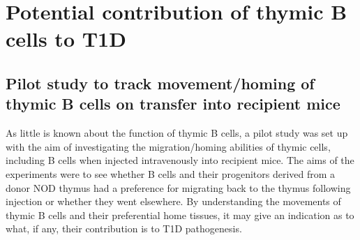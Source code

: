 \section{Potential contribution of thymic B cells to T1D}

\subsection{Pilot study to track movement/homing of thymic B cells on transfer into recipient mice}



As little is known about the function of thymic B cells, a pilot study was set up with the aim of investigating the migration/homing abilities of thymic cells, including B cells when injected intravenously into recipient mice.
The aims of the experiments were to see whether B cells and their progenitors derived from a donor NOD thymus had a preference for migrating back to the thymus following injection or whether they went elsewhere.
By understanding the movements of thymic B cells and their preferential home tissues, it may give an indication as to what, if any, their contribution is to T1D pathogenesis.

